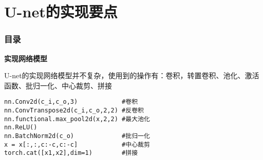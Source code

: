 \section{U-net的实现要点}

\begin{frame}[allowframebreaks]
  \frametitle{\textsc{目录}} \vspace{-0.3cm}
    \begin{spacing}{0.0}
    \end{spacing}   %
\end{frame}



\begin{frame}[fragile]
    \noindent\large\textbf{实现网络模型}

    \vspace{1em}
    U-net的实现网络模型并不复杂，使用到的操作有：卷积，转置卷积、池化、激活函数、批归一化、中心裁剪、拼接
    \begin{lstlisting}
nn.Conv2d(c_i,c_o,3)            #卷积
nn.ConvTranspose2d(c_i,c_o,2,2) #反卷积
nn.functional.max_pool2d(x,2,2) #最大池化
nn.ReLU()
nn.BatchNorm2d(c_o)             #批归一化
x = x[:,:,c:-c,c:-c]            #中心裁剪
torch.cat([x1,x2],dim=1)        #拼接
    \end{lstlisting}
\end{frame}



